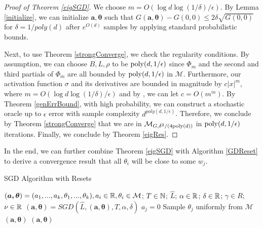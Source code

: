 \begin{proof}[Proof of Theorem \ref{eigSGD}]
We choose $m = O(\log d \log (1/\delta)/\epsilon)$. By Lemma \ref{initialize}, we can initialize $\boldsymbol{a,\theta}$ such that $G(\boldsymbol{a,\theta}) - G(0,0) \leq 2\delta \sqrt{G(0,0)}$ for $\delta = 1/poly(d)$ after $e^{O(d)}$ samples by applying standard probabilistic bounds.

Next, to use Theorem \ref{strongConverge}, we check the regularity conditions. By assumption, we can choose $B, L, \rho$ to be $\mathrm{poly}(d,1/\epsilon)$ since $\Phi_m$ and the second and third partials of $\Phi_m$ are all bounded by $\mathrm{poly}(d,1/\epsilon)$ in $\mathcal{M}$. Furthermore, our activation function $\sigma$ and its derivatives are bounded in magnitude by $c|x|^{m}$, where $m = O(\log d \log (1/\delta)/\epsilon)$ and by \cite{Hermite}, we can let $c = O(m^m)$. By Theorem \ref{genErrBound}, with high probability, we can construct a stochastic oracle up to $\epsilon$ error with sample complexity $d^{poly(d,1/\epsilon)}$. Therefore, we conclude by Theorem \ref{strongConverge} that we are in $\mathcal{M}_{G,\delta^2/(4\mathrm{poly}(d))}$ in $\mathrm{poly}(d,1/\epsilon)$ iterations. Finally, we conclude by Theorem \ref{eigRes}.
\end{proof}
%
In the end, we can further combine Theorem \ref{eigSGD} with Algorithm \ref{GDReset} to derive a convergence result that all $\theta_i$ will be close to some $w_j$.
 
 \begin{algorithm}[tb]
 \caption{SGD Algorithm with Resets}
   \label{GDReset}
\begin{algorithmic}
  $(\boldsymbol{a,\theta}) = (a_1,...,a_k,\theta_1,...,\theta_k), a_i
  \in{\mathbb{R}}, \theta_i\in\mathcal{M}$;
  $T\in {\mathbb{N}}$; $\widehat{L}$; $\alpha\in {\mathbb{R}}$; $\delta \in {\mathbb{R}}$;
  $\gamma \in R$; $\nu \in {\mathbb{R}}$ \vspace{0.1in} 
  \STATE $(\boldsymbol{a},\boldsymbol{\theta}) = SGD \left(\widehat{L}, (\boldsymbol{a},\boldsymbol{\theta}),T, \alpha,\delta \right)$
    \STATE $a_j = 0$
    \REPEAT \STATE Sample $\theta_j$
  uniformly from $\mathcal{M}$
    \ELSE {} $(\boldsymbol{a}, \boldsymbol{\theta}) $
      \ENDIF
    \ENDFOR
    $(\boldsymbol{a}, \boldsymbol{\theta}) $
   \end{algorithmic}
\end{algorithm}

